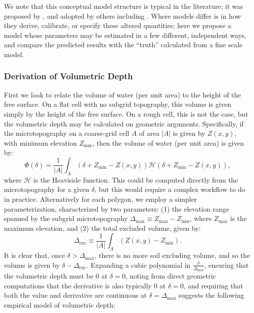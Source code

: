 We note that this conceptual model structure is typical in the literature; it was proposed by \citet{stammers1956effect,mwendera1992estimation}, and adopted by others including \citet{panday2004fully,thompson2010role,frei2012surface,frei2014representing}.
Where models differ is in how they derive, calibrate, or specify these altered quantities; here we propose a model whose parameters may be estimated in a few different, independent ways, and compare the predicted results with the ``truth'' calculated from a fine scale model.

\subsubsection{Derivation of Volumetric Depth}
First we look to relate the volume of water (per unit area) to the height of the free surface.
On a flat cell with no subgrid topography, this volume is given simply by the height of the free surface.
On a rough cell, this is not the case, but the volumetric depth may be calculated on geometric arguments.
Specifically, if the microtopography on a coarse-grid cell $A$ of area $|A|$ is given by $Z(x,y)$, with minimum elevation $Z_\text{min}$, then the volume of water (per unit area) is given by:
%
\begin{equation}\label{volumetric-depth1}
\Phi (\delta) = \frac{1}{|A|} \int_A \left( \delta + Z_\text{min} - Z(x,y) \right ) \mathcal{H} \left( \delta + Z_\text{min} - Z(x,y) \right ),
\end{equation}
%
where $\mathcal{H}$ is the Heaviside function.
This could be computed directly from the microtopography for a given $\delta$, but this would require a complex workflow to do in practice.
Alternatively for each polygon, we employ a simpler parameterization, characterized by two parameters: (1) the elevation range spanned by the subgrid microtopography $\Delta_\text{max} \equiv Z_\text{max} - Z_\text{min}$, where $Z_\text{max}$ is the maximum elevation, and (2) the total excluded volume, given by:
%
\begin{equation}\label{volumetric-depth1b}
\Delta_\text{exc} \equiv \frac{1}{|A|} \int_A \left( Z(x,y) - Z_\text{min} \right ).
\end{equation}
%
It is clear that, once $\delta > \Delta_\text{max}$, there is no more soil excluding volume, and so the volume is given by $\delta - \Delta_\text{exc}.$
Expanding a cubic polynomial in $\frac{\delta}{\Delta_\text{max}}$, ensuring that the volumetric depth must be $0$ at $\delta = 0$, noting from direct geometric computations that the derivative is also typically $0$ at $\delta = 0$, and requiring that both the value and derivative are continuous at $\delta = \Delta_\text{max}$ suggests the following empirical model of volumetric depth:
